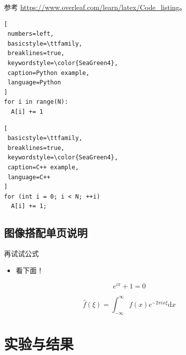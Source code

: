 \documentclass[
    fontset=fandol,
    xcolor=x11names %
]{ctexbeamer}
\begin{document}
\begin{frame}[fragile] %

参考 \url{https://www.overleaf.com/learn/latex/Code_listing}。

\begin{minipage}{.49\linewidth}

\begin{lstlisting}[
 numbers=left,
 basicstyle=\ttfamily,
 breaklines=true,
 keywordstyle=\color{SeaGreen4},
 caption=Python example,
 language=Python
]
for i in range(N):
  A[i] += 1
\end{lstlisting}

\end{minipage}\begin{minipage}{.49\linewidth}

\begin{lstlisting}[
 basicstyle=\ttfamily,
 breaklines=true,
 keywordstyle=\color{SeaGreen4},
 caption=C++ example,
 language=C++
]
for (int i = 0; i < N; ++i)
  A[i] += 1;
\end{lstlisting}

\end{minipage}
    
\end{frame}

\subsection{图像搭配单页说明}

\begin{frame}

    \begin{block}{再试试公式}
        \begin{itemize}
            \item 看下面！
        \end{itemize}
    \end{block}

    \begin{equation}
        e^{i\pi}+1=0
    \end{equation}

    \begin{equation}
        \hat{f}(\xi) = \int_{-\infty }^{\infty } f(x)e^{-2\pi ix\xi } \mathrm{d}x
    \end{equation}

\end{frame}

\section{实验与结果}
\end{document}
